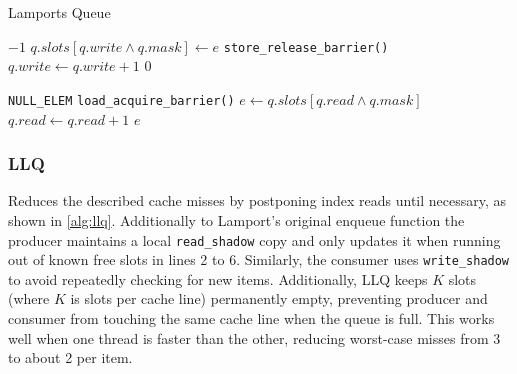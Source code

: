 \begin{algorithm}[!ht]
    \centering
    \captionsetup{justification=centering}
    \caption{Lamports Queue \cite{MaffioneCacheAware}}
    \label{alg:lamport-queue}
    \scriptsize
    \begin{algorithmic}[1]
             
                \State \Return $-1$ 
            \EndIf
            \State $q.slots[q.write \land q.mask] \gets e$
            \State \texttt{store\_release\_barrier()}
            \State $q.write \gets q.write + 1$
            \State \Return $0$
        \EndFunction
        
        \State
        
             
                \State \Return \texttt{NULL\_ELEM} 
            \EndIf
            \State \texttt{load\_acquire\_barrier()}
            \State $e \gets q.slots[q.read \land q.mask]$
            \State $q.read \gets q.read + 1$
            \State \Return $e$
        \EndFunction
    \end{algorithmic}
    \cite{MaffioneCacheAware}
\end{algorithm}

\subsubsection{\acf{LLQ}}
Reduces the described cache misses by postponing index reads until necessary, as shown in \cref{alg:llq}. Additionally to Lamport's original enqueue function the producer maintains a local \texttt{read\_shadow} copy and only updates it when running out of known free slots in lines 2 to 6. Similarly, the consumer uses \texttt{write\_shadow} to avoid repeatedly checking for new items. Additionally, \ac{LLQ} keeps $K$ slots (where $K$ is slots per cache line) permanently empty, preventing producer and consumer from touching the same cache line when the queue is full. This works well when one thread is faster than the other, reducing worst-case misses from 3 to about 2 per item. \cite{MaffioneCacheAware}

